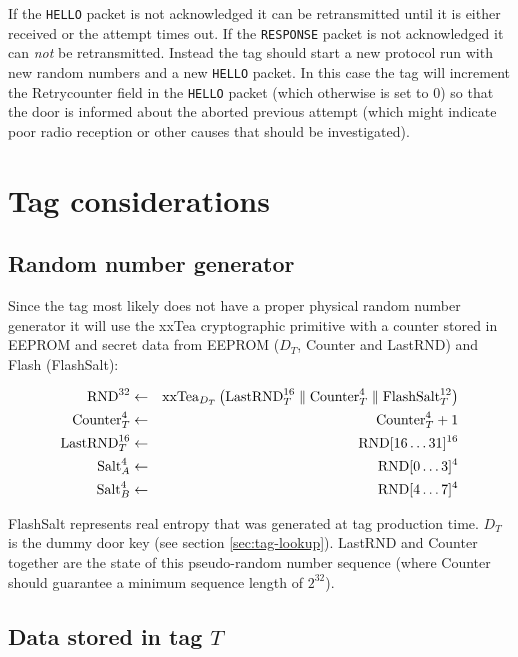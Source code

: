 \documentclass[a4paper,10pt]{scrartcl}
\begin{document}
If the \texttt{HELLO} packet is not acknowledged it can be retransmitted until it is either received or the attempt times out. If the \texttt{RESPONSE} packet is not acknowledged it can \emph{not} be retransmitted. Instead the tag should start a new protocol run with new random numbers and a new \texttt{HELLO} packet. In this case the tag will increment the Retrycounter field in the \texttt{HELLO} packet (which otherwise is set to $0$) so that the door is informed about the aborted previous attempt (which might indicate poor radio reception or other causes that should be investigated).

\section{Tag considerations}
\subsection{Random number generator} \label{sec:tag-rng}
Since the tag most likely does not have a proper physical random number generator it will use the xxTea cryptographic primitive with a counter stored in EEPROM and secret data from EEPROM ($D_T$, Counter and LastRND) and Flash (FlashSalt):

\begin{eqnarray*}
\textnormal{RND}^{32} &\leftarrow& \textnormal{xxTea}_{D_T}\left(\textnormal{LastRND}_T^{16} \parallel \textnormal{Counter}_T^{4} \parallel \textnormal{FlashSalt}_T^{12} \right) \\
\textnormal{Counter}_T^{4} &\leftarrow& \textnormal{Counter}_T^{4} + 1 \\
\textnormal{LastRND}_T^{16} &\leftarrow& \textnormal{RND}[16\ldots31]^{16} \\
\textnormal{Salt}_A^{4} &\leftarrow& \textnormal{RND}[0\ldots3]^{4} \\
\textnormal{Salt}_B^{4} &\leftarrow& \textnormal{RND}[4\ldots7]^{4} \\
\end{eqnarray*}

FlashSalt represents real entropy that was generated at tag production time. $D_T$ is the dummy door key (see section \ref{sec:tag-lookup}). LastRND and Counter together are the state of this pseudo-random number sequence (where Counter should guarantee a minimum sequence length of $2^{32}$).

\subsection{Data stored in tag $T$}
\end{document}
